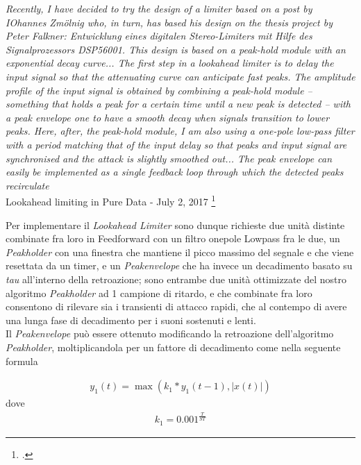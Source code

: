 \begin{center}
    \vspace{0.5cm}
    \textit{Recently, I have decided to try the design of a limiter based on a post by IOhannes Zmölnig who, 
    in turn, has based his design on the thesis project by Peter Falkner: 
    Entwicklung eines digitalen Stereo-Limiters mit Hilfe des Signalprozessors DSP56001.
    This design is based on a peak-hold module with an exponential decay curve...
    The first step in a lookahead limiter is to delay the input signal so 
    that the attenuating curve can anticipate fast peaks. 
    The amplitude profile of the input signal is obtained by combining a peak-hold module 
    – something that holds a peak for a certain time until a new peak is detected – 
    with a peak envelope one to have a smooth decay when signals transition to lower peaks. 
    Here, after, the peak-hold module, 
    I am also using a one-pole low-pass filter with a period matching that of the input delay 
    so that peaks and input signal are synchronised and the attack is slightly smoothed out... 
    The peak envelope can easily be implemented as a single feedback loop through which the detected peaks recirculate}\\
    \vspace{0.5cm}
    Lookahead limiting in Pure Data - July 2, 2017
    \footcite{https://www.dariosanfilippo.com/blog/2017/lookahead-limiting-in-pure-data/}
    \vspace{0.5cm}
    \end{center}

Per implementare il \textit{Lookahead Limiter} 
sono dunque richieste due unità distinte
combinate fra loro in Feedforward con un filtro onepole Lowpass fra le due,
un \textit{Peakholder} con una finestra che mantiene il picco massimo del segnale e
che viene resettata da un timer, 
e un \textit{Peakenvelope} che ha invece un decadimento 
basato su \textit{tau} all'interno della retroazione; sono entrambe due
unità ottimizzate del nostro algoritmo \textit{Peakholder} ad 1 campione di ritardo,
e che combinate fra loro consentono di rilevare sia i transienti di attacco rapidi, 
che al contempo di avere una lunga fase di decadimento per i suoni sostenuti e lenti.\\
Il \textit{Peakenvelope} può essere ottenuto modificando 
la retroazione dell'algoritmo \textit{Peakholder}, moltiplicandola per 
un fattore di decadimento come nella seguente formula 

\begin{align*}
    y_{1}(t) = \max\left( k_{1} * y_{1}(t\!-\!1), \left\lvert{x(t)}\right\rvert \right)
\end{align*}
dove 
\begin{align*}
    k_{1} = {0.001}^{\frac{T}{ST}} 
\end{align*} 

